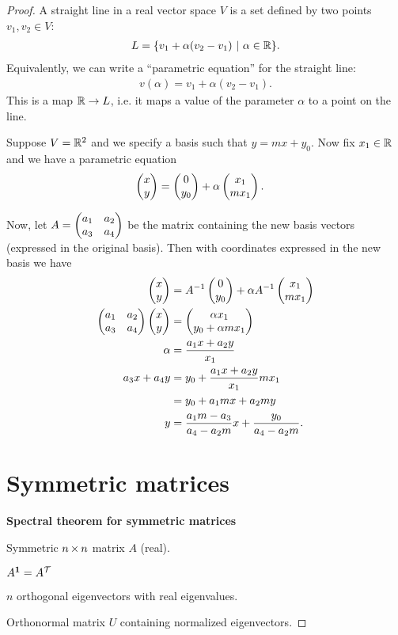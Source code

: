 \begin{proof}
  A straight line in a real vector space $V$ is a set defined by two points $v_1, v_2 \in V$:
  \begin{align*}
    L = \{v_1 + \alpha(v_2 - v_1) ~|~ \alpha \in \mathbb{R} \}.
  \end{align*}
  Equivalently, we can write a ``parametric equation'' for the straight line:
  \begin{align*}
    v(\alpha) = v_1 + \alpha(v_2 - v_1).
  \end{align*}
  This is a map $\mathbb{R} \to L$, i.e. it maps a value of the parameter $\alpha$ to a point on the line.

  Suppose $V = \mathbb{R}^2$ and we specify a basis such that $y = mx + y_0$. Now fix $x_1 \in \mathbb{R}$ and we
  have a parametric equation
  \begin{align*}
    \begin{pmatrix}x\\y\end{pmatrix} &= \begin{pmatrix}0\\y_0\end{pmatrix} + \alpha\begin{pmatrix}x_1\\mx_1\end{pmatrix}.
  \end{align*}

  Now, let $A = \begin{pmatrix}a_1 & a_2\\a_3 & a_4\\ \end{pmatrix}$ be the matrix containing the new basis vectors
  (expressed in the original basis). Then with coordinates expressed in the new basis we have
  \begin{align*}
    \begin{pmatrix}x\\y\end{pmatrix}                    &= A^{-1}\begin{pmatrix}0\\y_0\end{pmatrix} + \alpha A^{-1}\begin{pmatrix}x_1\\mx_1\end{pmatrix} \\
    \begin{pmatrix}a_1 & a_2\\a_3 & a_4\\ \end{pmatrix}\begin{pmatrix}x\\y\end{pmatrix} &= \begin{pmatrix}\alpha x_1\\y_0 + \alpha mx_1\end{pmatrix} \\
    \alpha &= \frac{a_1x + a_2y}{x_1} \\
    a_3x + a_4y &= y_0 + \frac{a_1x + a_2y}{x_1} mx_1 \\
                &= y_0 + a_1mx + a_2my \\
    y &= \frac{a_1m - a_3}{a_4 - a_2m}x + \frac{y_0}{a_4 - a_2m}.
  \end{align*}


\newpage
\section{Symmetric matrices}

\textbf{Spectral theorem for symmetric matrices}

Symmetric $n \operatorname{\times} n$ matrix $A$ (real).

$A^{\mathbf 1} = A^\mathcal T$

$n$ orthogonal eigenvectors with real eigenvalues.

Orthonormal matrix $U$ containing normalized eigenvectors.


\end{proof}
